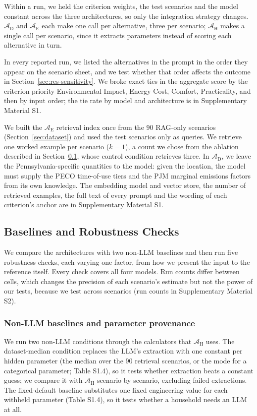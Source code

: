 \documentclass[final,3p,times]{elsarticle}
\begin{document}
Within a run, we held the criterion weights, the test scenarios and the model constant across the three architectures, so only the integration strategy changes. $\mathcal{A}_{\text{D}}$ and $\mathcal{A}_{\text{E}}$ each make one call per alternative, three per scenario; $\mathcal{A}_{\text{H}}$ makes a single call per scenario, since it extracts parameters instead of scoring each alternative in turn.

In every reported run, we listed the alternatives in the prompt in the order they appear on the scenario sheet, and we test whether that order affects the outcome in Section~\ref{sec:res-sensitivity}. We broke exact ties in the aggregate score by the criterion priority Environmental Impact, Energy Cost, Comfort, Practicality, and then by input order; the tie rate by model and architecture is in Supplementary Material S1.

We built the $\mathcal{A}_{\text{E}}$ retrieval index once from the 90 RAG-only scenarios (Section~\ref{sec:dataset}) and used the test scenarios only as queries. We retrieve one worked example per scenario ($k=1$), a count we chose from the ablation described in Section~\ref{sec:ablation-design}, whose control condition retrieves three. In $\mathcal{A}_{\text{D}}$, we leave the Pennsylvania-specific quantities to the model: given the location, the model must supply the PECO time-of-use tiers and the PJM marginal emissions factors from its own knowledge. The embedding model and vector store, the number of retrieved examples, the full text of every prompt and the wording of each criterion's anchor are in Supplementary Material S1.

\FloatBarrier
\subsection{Baselines and Robustness Checks}
\label{sec:ablation-design}
We compare the architectures with two non-LLM baselines and then run five robustness checks, each varying one factor, from how we present the input to the reference itself. Every check covers all four models. Run counts differ between cells, which changes the precision of each scenario's estimate but not the power of our tests, because we test across scenarios (run counts in Supplementary Material S2).

\subsubsection{Non-LLM baselines and parameter provenance}
\label{sec:hybrid-ablation-methods}
We run two non-LLM conditions through the calculators that $\mathcal{A}_{\text{H}}$ uses. The dataset-median condition replaces the LLM's extraction with one constant per hidden parameter (the median over the 90 retrieval scenarios, or the mode for a categorical parameter; Table S1.4), so it tests whether extraction beats a constant guess; we compare it with $\mathcal{A}_{\text{H}}$ scenario by scenario, excluding failed extractions. The fixed-default baseline substitutes one fixed engineering value for each withheld parameter (Table S1.4), so it tests whether a household needs an LLM at all.
\end{document}
